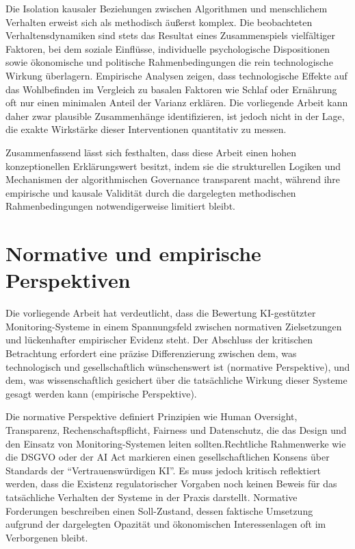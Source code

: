 Die Isolation kausaler Beziehungen zwischen Algorithmen und menschlichem Verhalten erweist sich als methodisch äußerst komplex. Die beobachteten Verhaltensdynamiken sind stets das Resultat eines Zusammenspiels vielfältiger Faktoren, bei dem soziale Einflüsse, individuelle psychologische Dispositionen sowie ökonomische und politische Rahmenbedingungen die rein technologische Wirkung überlagern. Empirische Analysen zeigen, dass technologische Effekte auf das Wohlbefinden im Vergleich zu basalen Faktoren wie Schlaf oder Ernährung oft nur einen minimalen Anteil der Varianz erklären. Die vorliegende Arbeit kann daher zwar plausible Zusammenhänge identifizieren, ist jedoch nicht in der Lage, die exakte Wirkstärke dieser Interventionen quantitativ zu messen.

Zusammenfassend lässt sich festhalten, dass diese Arbeit einen hohen konzeptionellen Erklärungswert besitzt, indem sie die strukturellen Logiken und Mechanismen der algorithmischen Governance transparent macht, während ihre empirische und kausale Validität durch die dargelegten methodischen Rahmenbedingungen notwendigerweise limitiert bleibt.

\section{Normative und empirische Perspektiven}

Die vorliegende Arbeit hat verdeutlicht, dass die Bewertung \ac{KI}-gestützter Monitoring-Systeme in einem Spannungsfeld zwischen normativen Zielsetzungen und lückenhafter empirischer Evidenz steht. Der Abschluss der kritischen Betrachtung erfordert eine präzise Differenzierung zwischen dem, was technologisch und gesellschaftlich wünschenswert ist (normative Perspektive), und dem, was wissenschaftlich gesichert über die tatsächliche Wirkung dieser Systeme gesagt werden kann (empirische Perspektive).

Die normative Perspektive definiert Prinzipien wie Human Oversight, Transparenz, Rechenschaftspflicht, Fairness und Datenschutz, die das Design und den Einsatz von Monitoring-Systemen leiten sollten.Rechtliche Rahmenwerke wie die \ac{DSGVO} oder der \ac{AI} Act markieren einen gesellschaftlichen Konsens über Standards der \enquote{Vertrauenswürdigen KI}. Es muss jedoch kritisch reflektiert werden, dass die Existenz regulatorischer Vorgaben noch keinen Beweis für das tatsächliche Verhalten der Systeme in der Praxis darstellt. Normative Forderungen beschreiben einen Soll-Zustand, dessen faktische Umsetzung aufgrund der dargelegten Opazität und ökonomischen Interessenlagen oft im Verborgenen bleibt.

